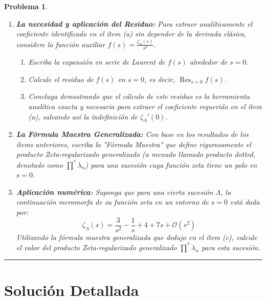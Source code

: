 \documentclass[12pt,a4paper]{article}
\newtheorem{problem}{Problema}
\newcommand{\Res}{\operatorname{Res}}
\begin{document}
\begin{problem}
\begin{enumerate}[label=\alph*)]
    \item \textbf{La necesidad y aplicación del Residuo:} Para extraer analíticamente el coeficiente identificado en el ítem (a) sin depender de la derivada clásica, considere la función auxiliar $f(s) = \frac{\zeta_{\Lambda}(s)}{s^2}$. 
    \begin{enumerate}[label=\roman*)]
        \item Escriba la expansión en serie de Laurent de $f(s)$ alrededor de $s=0$.
        \item Calcule el residuo de $f(s)$ en $s=0$, es decir, $\Res_{s=0} f(s)$.
        \item Concluya demostrando que el cálculo de este residuo es la herramienta analítica exacta y necesaria para extraer el coeficiente requerido en el ítem (a), salvando así la indefinición de $\zeta_{\Lambda}'(0)$.
    \end{enumerate}
    
    \item \textbf{La Fórmula Maestra Generalizada:} Con base en los resultados de los ítems anteriores, escriba la "Fórmula Maestra" que define rigurosamente el producto Zeta-regularizado generalizado (a menudo llamado \textit{producto dotted}, denotado como $\prod^* \lambda_n$) para una sucesión cuya función zeta tiene un polo en $s=0$.
    
    \item \textbf{Aplicación numérica:} Suponga que para una cierta sucesión $\Lambda$, la continuación meromorfa de su función zeta en un entorno de $s=0$ está dada por:
    \begin{equation}
        \zeta_{\Lambda}(s) = \frac{3}{s^2} - \frac{1}{s} + 4 + 7s + \mathcal{O}(s^2)
    \end{equation}
    Utilizando la fórmula maestra generalizada que dedujo en el ítem (c), calcule el valor del producto Zeta-regularizado generalizado $\prod^* \lambda_n$ para esta sucesión.
\end{enumerate}
\end{problem}

\vspace{1cm}
\hrule
\vspace{1cm}

\section*{Solución Detallada}
\end{document}
